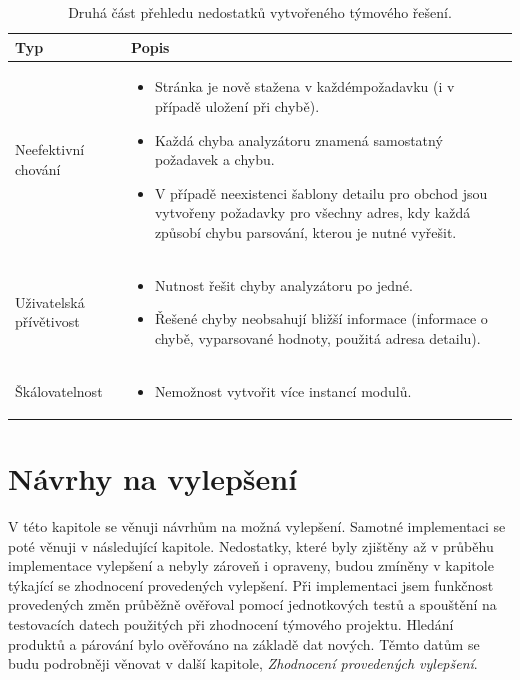 \documentclass[thesis=B,czech]{FITthesis}[2012/06/26]
\begin{document}
\begin{table}[h]\centering
    \begin{tabular}{ | l | p{7cm} |}  
    \hline
    Typ & Popis \\ \hline
	Neefektivní chování & 
		\begin{itemize}
  			\item Stránka je nově stažena  v každémpožadavku (i v případě uložení při chybě).
  			\item Každá chyba analyzátoru znamená samostatný požadavek a chybu.
  			\item V případě neexistenci šablony detailu pro obchod jsou vytvořeny požadavky pro všechny adres, kdy každá způsobí chybu parsování, kterou je nutné vyřešit.
  		\end{itemize} \\ \hline	
	\hline
	Uživatelská přívětivost & 
		\begin{itemize}
  			\item Nutnost řešit chyby analyzátoru po jedné.
  			\item Řešené chyby neobsahují bližší informace (informace o chybě, vyparsované hodnoty, použitá adresa detailu).
  		\end{itemize} \\ \hline	
	\hline
	Škálovatelnost & 
		\begin{itemize}
  			\item Nemožnost vytvořit více instancí modulů.
  		\end{itemize} \\ \hline
    \end{tabular}
	\caption{Druhá část přehledu nedostatků vytvořeného týmového řešení.}
	\label{table:analysis-old2}
\end{table}


\chapter{Návrhy na vylepšení}
V této kapitole se věnuji návrhům na možná vylepšení. Samotné implementaci se poté věnuji v následující kapitole. 
Nedostatky, které byly zjištěny až v průběhu implementace vylepšení a nebyly zároveň i opraveny, budou zmíněny v kapitole týkající se zhodnocení
provedených vylepšení. Při implementaci jsem funkčnost provedených změn průběžně ověřoval pomocí jednotkových testů a spouštění na testovacích datech použitých při zhodnocení týmového projektu. Hledání produktů a párování bylo ověřováno na základě dat nových. Těmto datům se budu podrobněji věnovat v další kapitole, \textit{Zhodnocení provedených vylepšení}.
\par
\end{document}

